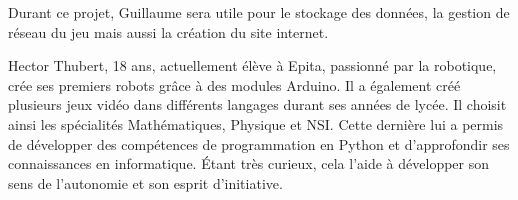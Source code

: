 \documentclass[12pt,a4paper]{article}
\begin{document}
\noindent Durant ce projet, Guillaume sera utile pour le stockage des données, la gestion de réseau du jeu mais aussi la création du site internet.

Hector Thubert, 18 ans, actuellement élève à Epita, passionné par la robotique, crée ses premiers robots grâce à des modules Arduino. Il a également créé plusieurs jeux vidéo dans différents langages durant ses années de lycée. Il choisit ainsi les spécialités Mathématiques, Physique et NSI. Cette dernière lui a permis de développer des compétences de programmation en Python et d’approfondir ses connaissances en informatique. Étant très curieux, cela l’aide à développer son sens de l’autonomie et son esprit d’initiative.
\end{document}
